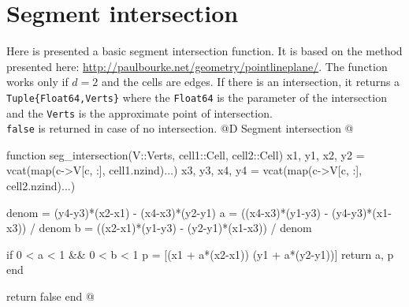 \documentclass[10pt,oneside]{article}
\begin{document}
\section{Segment intersection}
\label{seg_intersection}
Here is presented a basic segment intersection function.
It is based on the method presented here: \url{http://paulbourke.net/geometry/pointlineplane/}.
The function works only if $d=2$ and the cells are edges.
If there is an intersection, it returns a \texttt{Tuple\{Float64,Verts\}} where 
the \texttt{Float64} is the parameter of the intersection and the \texttt{Verts} 
is the approximate point of intersection. \\
\texttt{false} is returned in case of no intersection.
@D Segment intersection
@{function seg_intersection(V::Verts, cell1::Cell, cell2::Cell)
    x1, y1, x2, y2 = vcat(map(c->V[c, :], cell1.nzind)...)
    x3, y3, x4, y4 = vcat(map(c->V[c, :], cell2.nzind)...)
    
    denom = (y4-y3)*(x2-x1) - (x4-x3)*(y2-y1)
    a = ((x4-x3)*(y1-y3) - (y4-y3)*(x1-x3)) / denom
    b = ((x2-x1)*(y1-y3) - (y2-y1)*(x1-x3)) / denom

    if 0 < a < 1 && 0 < b < 1
        p = [(x1 + a*(x2-x1))  (y1 + a*(y2-y1))]
        return a, p
    end

    return false
end
@}

\end{document}
